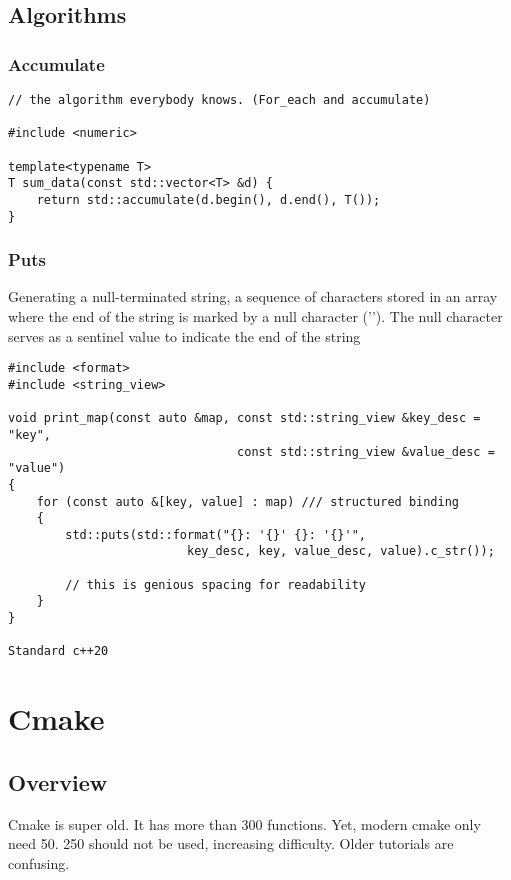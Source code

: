 \documentclass[openany]{report}
\begin{document}
\section{Algorithms}

\subsection{Accumulate}

\begin{verbatim}
// the algorithm everybody knows. (For_each and accumulate)

#include <numeric>

template<typename T>
T sum_data(const std::vector<T> &d) {
    return std::accumulate(d.begin(), d.end(), T());
}
\end{verbatim}

\subsection{Puts}

Generating a null-terminated string,  a sequence of characters stored in an array
where the end of the string is marked by a null character ('\0'). 
The null character serves as a sentinel value to indicate the end of the string

\begin{verbatim}
#include <format>
#include <string_view>

void print_map(const auto &map, const std::string_view &key_desc = "key",
                                const std::string_view &value_desc = "value")
{
    for (const auto &[key, value] : map) /// structured binding
    {
        std::puts(std::format("{}: '{}' {}: '{}'",
                         key_desc, key, value_desc, value).c_str());

        // this is genious spacing for readability
    }
}

Standard c++20
\end{verbatim}
\chapter{Cmake}

\section{Overview}

Cmake is super old. It has more than 300 functions.
Yet, modern cmake only need 50. 250 should not be used, increasing difficulty.
Older tutorials are confusing.
\end{document}
